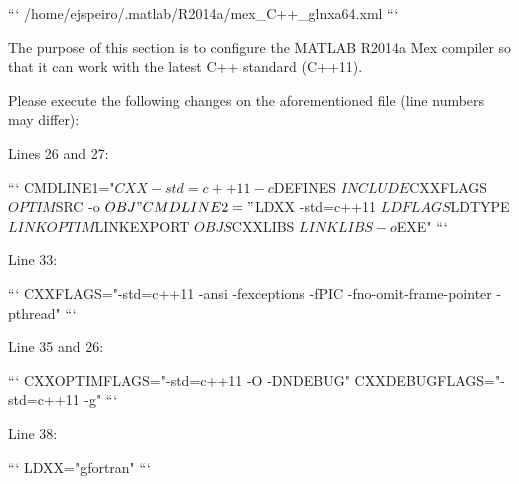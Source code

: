 \begin{DoxyPre}```
/home/ejspeiro/.matlab/R2014a/mex\_C++\_glnxa64.xml
```\end{DoxyPre}



\begin{DoxyPre}The purpose of this section is to configure the MATLAB R2014a Mex compiler so
that it can work with the latest C++ standard (C++11).\end{DoxyPre}



\begin{DoxyPre}Please execute the following changes on the aforementioned file (line numbers
may differ):\end{DoxyPre}



\begin{DoxyPre}Lines 26 and 27:\end{DoxyPre}



\begin{DoxyPre}```
CMDLINE1="$CXX -std=c++11 -c $DEFINES $INCLUDE $CXXFLAGS $OPTIM $SRC -o $OBJ"
CMDLINE2="$LDXX -std=c++11 $LDFLAGS $LDTYPE $LINKOPTIM $LINKEXPORT $OBJS $CXXLIBS $LINKLIBS -o $EXE"
```\end{DoxyPre}



\begin{DoxyPre}Line 33:\end{DoxyPre}



\begin{DoxyPre}```
CXXFLAGS="-std=c++11 -ansi -fexceptions -fPIC -fno-omit-frame-pointer -pthread"
```\end{DoxyPre}



\begin{DoxyPre}Line 35 and 26:\end{DoxyPre}



\begin{DoxyPre}```
CXXOPTIMFLAGS="-std=c++11 -O -DNDEBUG"
CXXDEBUGFLAGS="-std=c++11 -g"
```\end{DoxyPre}



\begin{DoxyPre}Line 38:\end{DoxyPre}



\begin{DoxyPre}```
LDXX="gfortran"
```\end{DoxyPre}



